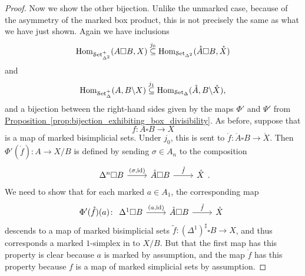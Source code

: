\documentclass[main.tex]{subfiles}
\begin{document}
\begin{proof}
  Now we show the other bijection. Unlike the unmarked case, because of the asymmetry of the marked box product, this is not precisely the same as what we have just shown. Again we have inclusions
  \begin{equation*}
    \mathrm{Hom}_{\mathcal{S}\mathrm{et}_{\Delta^{2}}^{+}}(A \square B, X) \overset{j_{0}}{\subseteq} \mathrm{Hom}_{\mathcal{S}\mathrm{et}_{\Delta^{2}}}(\mathring{A} \square B, \mathring{X})
  \end{equation*}
  and
  \begin{equation*}
    \mathrm{Hom}_{\mathcal{S}\mathrm{et}_{\Delta}^{+}}(A, B \backslash X) \overset{j_{1}}{\subseteq} \mathrm{Hom}_{\mathcal{S}\mathrm{et}_{\Delta}}(\mathring{A}, B \backslash \mathring{X}),
  \end{equation*}
  and a bijection between the right-hand sides given by the maps $\Phi'$ and $\Psi'$ from \hyperref[prop:bijection_exhibiting_box_divisibility]{Proposition~\ref*{prop:bijection_exhibiting_box_divisibility}}. As before, suppose that
  \begin{equation*}
    f\colon A \square B \to X
  \end{equation*}
  is a map of marked bisimplicial sets. Under $j_{0}$, this is sent to $\mathring{f}\colon \mathring{A} \square B \to \mathring{X}$. Then $\Phi'(\mathring{f})\colon A \to X / B$ is defined by sending $\sigma \in A_{n}$ to the composition
  \begin{equation*}
    \begin{tikzcd}
      \Delta^{n} \square B
      \arrow[r, "{(\sigma, \id)}"]
      & \mathring{A} \square B
      \arrow[r, "\mathring{f}"]
      & \mathring{X}
    \end{tikzcd}.
  \end{equation*}
  We need to show that for each marked $a \in A_{1}$, the corresponding map
  \begin{equation*}
    \Phi'(\mathring{f})(a)\colon
    \begin{tikzcd}
      \Delta^{1} \square B
      \arrow[r, "{(a, \id)}"]
      & \mathring{A} \square B
      \arrow[r, "\mathring{f}"]
      & \mathring{X}
    \end{tikzcd}
  \end{equation*}
  descends to a map of marked bisimplicial sets $\tilde{f}\colon (\Delta^{1})^{\sharp} \square B \to X$, and thus corresponds a marked $1$-simplex in to $X / B$. But that the first map has this property is clear because $a$ is marked by assumption, and the map $\mathring{f}$ has this property because $f$ is a map of marked simplicial sets by assumption.


\end{proof}
\end{document}
